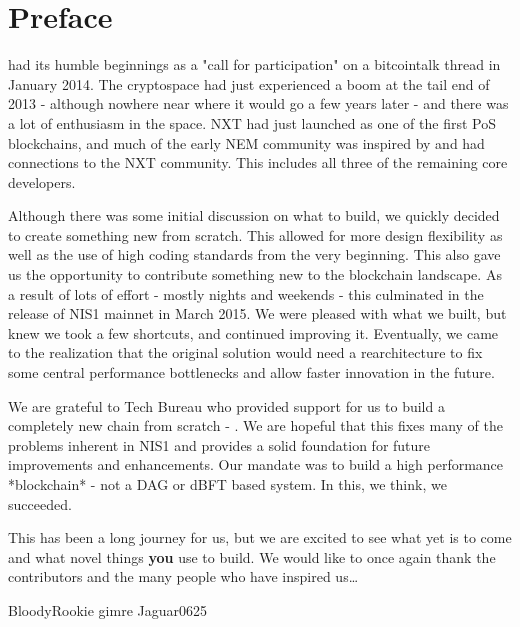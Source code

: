\section*{Preface}


 had its humble beginnings as a "call for participation" on a bitcointalk thread in January 2014.
The cryptospace had just experienced a boom at the tail end of 2013 - although nowhere near where it would go a few years later - and there was a lot of enthusiasm in the space.
NXT had just launched as one of the first PoS blockchains, and much of the early NEM community was inspired by and had connections to the NXT community. This includes all three of the remaining core developers.

Although there was some initial discussion on what to build, we quickly decided to create something new from scratch.
This allowed for more design flexibility as well as the use of high coding standards from the very beginning.
This also gave us the opportunity to contribute something new to the blockchain landscape.
As a result of lots of effort - mostly nights and weekends - this culminated in the release of NIS1 mainnet in March 2015.
We were pleased with what we built, but knew we took a few shortcuts, and continued improving it.
Eventually, we came to the realization that the original solution would need a rearchitecture to fix some central performance bottlenecks and allow faster innovation in the future.

We are grateful to Tech Bureau who provided support for us to build a completely new chain from scratch - \codename.
We are hopeful that this fixes many of the problems inherent in NIS1 and provides a solid foundation for future improvements and enhancements.
Our mandate was to build a high performance *blockchain* - not a DAG or dBFT based system.
In this, we think, we succeeded.

This has been a long journey for us, but we are excited to see what yet is to come and what novel things \textbf{you} use \codenamespace to build.
We would like to once again thank the contributors and the many people who have inspired us\ldots

\begin{flushright}
	BloodyRookie
	gimre
	Jaguar0625
\end{flushright}
